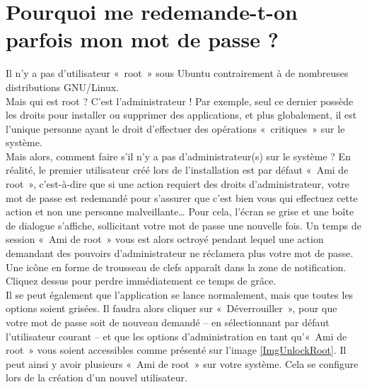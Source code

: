 \section{Pourquoi me redemande-t-on parfois mon mot de passe ?}
\label{RefMdpRoot}
Il n'y a pas d'utilisateur «~root~» sous Ubuntu contrairement à de nombreuses distributions GNU/Linux.\\
Mais qui est root ? C'est l'administrateur ! Par exemple, seul ce dernier possède les droits pour installer ou supprimer des applications, et plus globalement, il est l'unique personne ayant le droit d'effectuer des opérations «~critiques~» sur le système.\\
Mais alors, comment faire s'il n'y a pas d'administrateur(s) sur le système ? En réalité, le premier utilisateur créé lors de l'installation est par défaut «~Ami de root~», c'est-à-dire que si une action requiert des droits d'administrateur, votre mot de passe est redemandé pour s'assurer que c'est bien vous qui effectuez cette action et non une personne malveillante\ldots{} Pour cela, l'écran se grise et une boîte de dialogue s'affiche, sollicitant votre mot de passe une nouvelle fois. Un temps de session «~Ami de root~» vous est alors octroyé pendant lequel une action demandant des pouvoirs d'administrateur ne réclamera plus votre mot de passe. Une icône en forme de trousseau de clefs apparaît dans la zone de notification. Cliquez dessus pour perdre immédiatement ce temps de grâce.\\
Il se peut également que l'application se lance normalement, mais que toutes les options soient grisées. Il faudra alors cliquer sur «~Déverrouiller~», pour que votre mot de passe soit de nouveau demandé -- en sélectionnant par défaut l'utilisateur courant -- et que les options d'administration en tant qu'«~Ami de root~» vous soient accessibles comme présenté sur l'image \ref{ImgUnlockRoot}. Il peut ainsi y avoir plusieurs «~Ami de root~» sur votre système. Cela se configure lors de la création d'un nouvel utilisateur.
